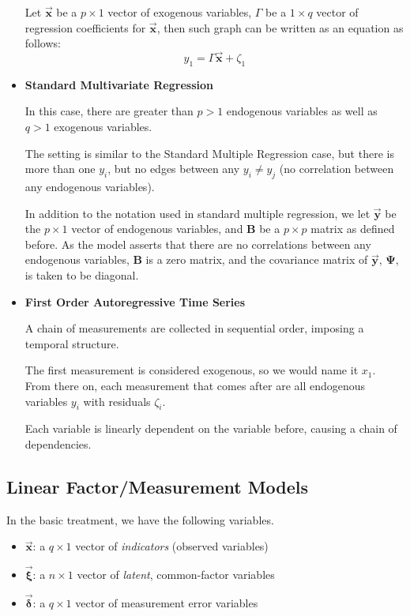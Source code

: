 \documentclass{article}
\begin{document}
\begin{multicols*}{2}
\begin{itemize}
\begin{itemize}
    \end{itemize}
    
    Let $\mathbf{\vec{x}}$ be a $p \times 1$ vector of exogenous variables, $\Gamma$ be a $1 \times q$ vector of regression coefficients for $\mathbf{\vec{x}}$, then such graph can be written as an equation as follows: \[y_1 = \Gamma \mathbf{\vec{x}} + \zeta_1\]

    \item \textbf{Standard Multivariate Regression}
    
    In this case, there are greater than $p > 1$ endogenous variables as well as $q > 1$ exogenous variables. 
    
    The setting is similar to the Standard Multiple Regression case, but there is more than one $y_i$, but no edges between any $y_i \neq y_j$ (no correlation between any endogenous variables).

    In addition to the notation used in standard multiple regression, we let $\mathbf{\vec{y}}$ be the $p \times 1$ vector of endogenous variables, and $\mathbf{B}$ be a $p \times p$ matrix as defined before. As the model asserts that there are no correlations between any endogenous variables, $\mathbf{B}$ is a zero matrix, and the covariance matrix of $\mathbf{\vec{y}}$, $\mathbf{\Psi}$, is taken to be diagonal.

    \item \textbf{First Order Autoregressive Time Series}
    
    A chain of measurements are collected in sequential order, imposing a temporal structure.

    The first measurement is considered exogenous, so we would name it $x_1$. From there on, each measurement that comes after are all endogenous variables $y_i$ with residuals $\zeta_i$. 
    
    Each variable is linearly dependent on the variable before, causing a chain of dependencies.
\end{itemize}

\subsection{Linear Factor/Measurement Models}

In the basic treatment, we have the following variables.

\begin{itemize}
    \item $\mathbf{\vec{x}}$: a $q \times 1$ vector of \textit{indicators} (observed variables)
    \item $\mathbf{\vec{\xi}}$: a $n \times 1$ vector of \textit{latent}, common-factor variables
    \item $\mathbf{\vec{\delta}}$: a $q \times 1$ vector of measurement error variables
\end{itemize}


\end{multicols*}
\end{document}
